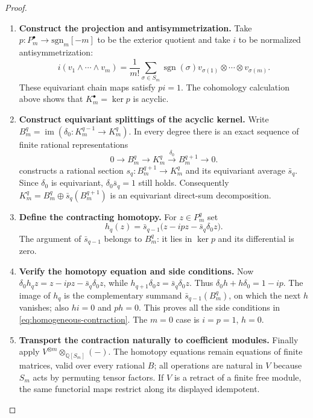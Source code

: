 \documentclass[11pt,a4paper]{article}
\numberwithin{algorithm}{section}
\numberwithin{equation}{section}
\theoremstyle{definition}
\theoremstyle{remark}
\theoremstyle{plain}
\newcommand{\QQ}{\mathbb Q}
\theoremstyle{definition}
\theoremstyle{plain}
\begin{document}
\begin{proof}
\begin{enumerate}[leftmargin=*,align=left]
\item \textbf{Construct the projection and antisymmetrization.}
Take $p:P_m^\bullet\to\mathrm{sgn}_m[-m]$ to be the
exterior quotient and take $i$ to be normalized antisymmetrization:
\[
 i(v_1\wedge\cdots\wedge v_m)=\frac1{m!}
 \sum_{\sigma\in S_m}\operatorname{sgn}(\sigma)
 v_{\sigma(1)}\otimes\cdots\otimes v_{\sigma(m)}.
\]
These equivariant chain maps satisfy $pi=1$. The cohomology
calculation above shows that $K_m^\bullet=\ker p$ is acyclic.

\item \textbf{Construct equivariant splittings of the acyclic kernel.}
Write $B_m^q=\operatorname{im}(\delta_0:K_m^{q-1}\to K_m^q)$.
In every degree there is an exact sequence of finite rational
representations
\[
 0\longrightarrow B_m^q\longrightarrow K_m^q
 \xrightarrow{\delta_0}B_m^{q+1}\longrightarrow0.
\]
 constructs a rational section
$s_q:B_m^{q+1}\to K_m^q$ and its equivariant average $\bar s_q$.
Since $\delta_0$ is equivariant,
$\delta_0\bar s_q=1$ still holds. Consequently
$K_m^q=B_m^q\oplus\bar s_q(B_m^{q+1})$ is an
equivariant direct-sum decomposition.

\item \textbf{Define the contracting homotopy.}
For $z\in P_m^q$ set
\[
 h_q(z)=\bar s_{q-1}
       \bigl(z-i pz-\bar s_q\delta_0z\bigr).
\]
The argument of $\bar s_{q-1}$ belongs to $B_m^q$:
it lies in $\ker p$ and its differential is zero.

\item \textbf{Verify the homotopy equation and side conditions.}
Now $\delta_0h_qz=z-ipz-\bar s_q\delta_0z$, while
$h_{q+1}\delta_0z=\bar s_q\delta_0z$.
Thus $\delta_0h+h\delta_0=1-ip$.
The image of $h_q$ is the complementary summand
$\bar s_{q-1}(B_m^q)$, on which the next $h$ vanishes;
also $hi=0$ and $ph=0$. This proves all the side conditions
in \eqref{eq:homogeneous-contraction}. The $m=0$ case is
$i=p=1$, $h=0$.

\item \textbf{Transport the contraction naturally to coefficient modules.}
Finally apply $V^{\otimes m}\otimes_{\QQ[S_m]}(-)$.
The homotopy equations remain equations of finite matrices,
valid over every rational $B$; all operations are natural in
$V$ because $S_m$ acts by permuting tensor factors.  If $V$
is a retract of a finite free module, the same functorial maps
restrict along its displayed idempotent.


\end{enumerate}
\end{proof}
\end{document}
